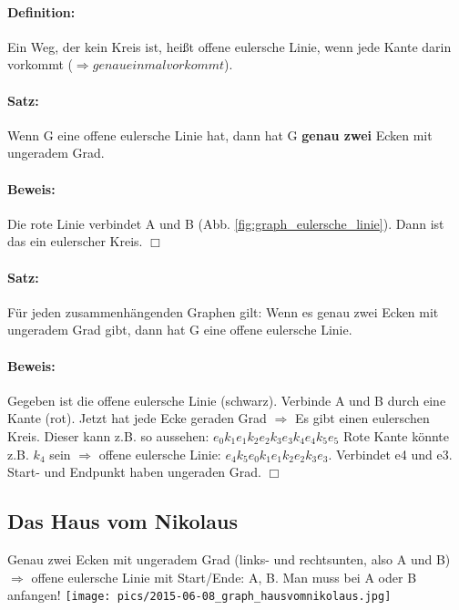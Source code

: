 \paragraph{Definition:}Ein Weg, der kein Kreis ist, heißt offene eulersche Linie, wenn jede Kante darin vorkommt ($\Rightarrow genau einmal vorkommt$). 

\paragraph{Satz:} Wenn G eine offene eulersche Linie hat, dann hat G \textbf{genau zwei} Ecken mit ungeradem Grad. 

\paragraph{Beweis:} Die rote Linie verbindet A und B (Abb. \ref{fig:graph_eulersche_linie}). Dann ist das ein eulerscher Kreis. $\Box$



\paragraph{Satz:}Für jeden zusammenhängenden Graphen gilt: Wenn es genau zwei Ecken mit ungeradem Grad gibt, dann hat G eine offene eulersche Linie. 

\paragraph{Beweis:} Gegeben ist die offene eulersche Linie (schwarz). Verbinde A und B durch eine Kante (rot). Jetzt hat jede Ecke geraden Grad $\Rightarrow$ Es gibt einen eulerschen Kreis. Dieser kann z.B. so aussehen: $e_0 k_1 e_1 k_2 e_2 k_3 e_3 k_4 e_4 k_5 e_5$ Rote Kante könnte z.B. $k_4$ sein $\Rightarrow$ offene eulersche Linie: $e_4 k_5 e_0 k_1 e_1 k_2 e_2 k_3 e_3$. Verbindet e4 und e3. Start- und Endpunkt haben ungeraden Grad. $\Box$




\subsection{Das Haus vom Nikolaus} 
Genau zwei Ecken mit ungeradem Grad (links- und rechtsunten, also A und B) $\Rightarrow$ offene eulersche Linie mit Start/Ende: A, B. Man muss bei A oder B anfangen! \texttt{[image: pics/2015-06-08\_graph\_hausvomnikolaus.jpg]}